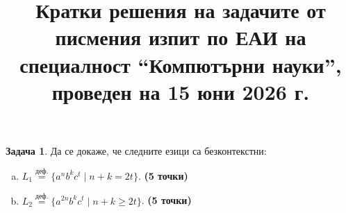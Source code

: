 \documentclass[12pt]{article}
\newcommand{\df}{\stackrel{\text{деф.}}{=}}
\theoremstyle{definition}
\newtheorem{problem}{Задача}
\begin{document}
\title{Кратки решения на задачите от писмения изпит по ЕАИ на специалност ``Компютърни науки'', проведен на 15 юни 2026 г.}
\date{}

\maketitle

\begin{problem}
  Да се докаже, че следните езици са безконтекстни:
  \begin{enumerate}[(a)]
    \item $L_1 \df \{ a^n b^k c^t \mid n + k = 2t \}$. {\bf (5 точки)}
    \item $L_2 \df \{ a^{2n} b^k c^t \mid n+k \geq 2t \}$. {\bf (5 точки)}
  \end{enumerate}
\end{problem}
\end{document}
